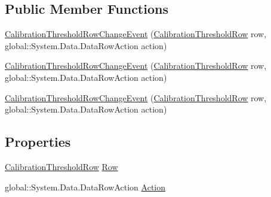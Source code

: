 \subsection*{Public Member Functions}
\begin{DoxyCompactItemize}
\item 
\hyperlink{class_env_int_1_1_win32_1_1_field_tech_1_1_manager_1_1_data_sets_1_1_guide_ware_mobile_data_set_fbaa872ead219fa1546c6a3dbe0bab70_a2b57d0415f10d2c0241aadc26d70342c}{Calibration\+Threshold\+Row\+Change\+Event} (\hyperlink{class_env_int_1_1_win32_1_1_field_tech_1_1_manager_1_1_data_sets_1_1_guide_ware_mobile_data_set_1_1_calibration_threshold_row}{Calibration\+Threshold\+Row} row, global\+::\+System.\+Data.\+Data\+Row\+Action action)
\item 
\hyperlink{class_env_int_1_1_win32_1_1_field_tech_1_1_manager_1_1_data_sets_1_1_guide_ware_mobile_data_set_fbaa872ead219fa1546c6a3dbe0bab70_a2b57d0415f10d2c0241aadc26d70342c}{Calibration\+Threshold\+Row\+Change\+Event} (\hyperlink{class_env_int_1_1_win32_1_1_field_tech_1_1_manager_1_1_data_sets_1_1_guide_ware_mobile_data_set_1_1_calibration_threshold_row}{Calibration\+Threshold\+Row} row, global\+::\+System.\+Data.\+Data\+Row\+Action action)
\item 
\hyperlink{class_env_int_1_1_win32_1_1_field_tech_1_1_manager_1_1_data_sets_1_1_guide_ware_mobile_data_set_fbaa872ead219fa1546c6a3dbe0bab70_a2b57d0415f10d2c0241aadc26d70342c}{Calibration\+Threshold\+Row\+Change\+Event} (\hyperlink{class_env_int_1_1_win32_1_1_field_tech_1_1_manager_1_1_data_sets_1_1_guide_ware_mobile_data_set_1_1_calibration_threshold_row}{Calibration\+Threshold\+Row} row, global\+::\+System.\+Data.\+Data\+Row\+Action action)
\end{DoxyCompactItemize}
\subsection*{Properties}
\begin{DoxyCompactItemize}
\item 
\hyperlink{class_env_int_1_1_win32_1_1_field_tech_1_1_manager_1_1_data_sets_1_1_guide_ware_mobile_data_set_1_1_calibration_threshold_row}{Calibration\+Threshold\+Row} \hyperlink{class_env_int_1_1_win32_1_1_field_tech_1_1_manager_1_1_data_sets_1_1_guide_ware_mobile_data_set_fbaa872ead219fa1546c6a3dbe0bab70_aaab0cdab7f2900d88f881bf3744feef1}{Row}
\item 
global\+::\+System.\+Data.\+Data\+Row\+Action \hyperlink{class_env_int_1_1_win32_1_1_field_tech_1_1_manager_1_1_data_sets_1_1_guide_ware_mobile_data_set_fbaa872ead219fa1546c6a3dbe0bab70_ae684288128fc9aeb5636ab70be45e039}{Action}
\end{DoxyCompactItemize}


